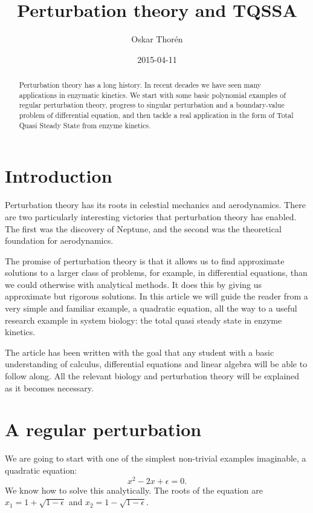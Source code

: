 \documentclass[12pt]{article}
\title{Perturbation theory and TQSSA}
\author{Oskar Thor\'{e}n}
\date{2015-04-11}
\begin{document}
\nocite{*} %
\maketitle

\begin{abstract}
  Perturbation theory has a long history. In recent decades we have
  seen many applications in enzymatic kinetics. We start with some
  basic polynomial examples of regular perturbation theory, progress
  to singular perturbation and a boundary-value problem of
  differential equation, and then tackle a real application in the
  form of Total Quasi Steady State from enzyme kinetics.
\end{abstract}

\clearpage
\tableofcontents
\clearpage

\section{Introduction}

Perturbation theory has its roots in celestial mechanics and
aerodynamics. There are two particularly interesting victories that
perturbation theory has enabled. The first was the discovery of
Neptune, and the second was the theoretical foundation for
aerodynamics.

The promise of perturbation theory is that it allows us to find
approximate solutions to a larger class of problems, for example, in
differential equations, than we could otherwise with analytical
methods. It does this by giving us approximate but rigorous
solutions. In this article we will guide the reader from a very simple
and familiar example, a quadratic equation, all the way to a useful
research example in system biology: the total quasi steady state in
enzyme kinetics.

The article has been written with the goal that any student with a
basic understanding of calculus, differential equations and linear
algebra will be able to follow along. All the relevant biology and
perturbation theory will be explained as it becomes necessary.

\newpage
\section{A regular perturbation}

We are going to start with one of the simplest non-trivial examples
imaginable, a quadratic equation:
\begin{equation}
x^2 - 2x + \epsilon = 0.
\end{equation}
We know how to solve this analytically. The roots of the equation are\\
$x_1 = 1 + \sqrt{1 - \epsilon}$ and $x_2 = 1 - \sqrt{1 - \epsilon}$.
\end{document}
